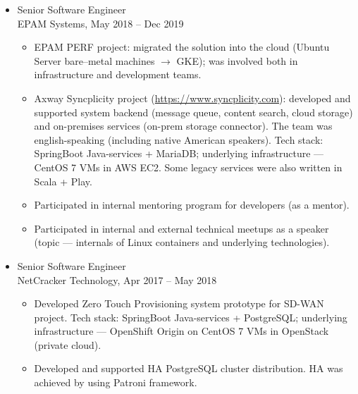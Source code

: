 \documentclass[letterpaper, 11pt]{article}
\begin{document}
    \begin{itemize}
        \item
            Senior Software Engineer \\
            \footnotesize
                EPAM Systems, May 2018 -- Dec 2019
            \normalsize
            
            \begin{itemize}
                \item
                    EPAM PERF project: migrated the solution into the cloud (Ubuntu Server bare--metal machines $\rightarrow$ GKE); was involved both in infrastructure and development teams.
                \item
                    Axway Syncplicity project (\url{https://www.syncplicity.com}): developed and supported system backend (message queue, content search, cloud storage) and on-premises services (on-prem storage connector). The team was english-speaking (including native American speakers). Tech stack: SpringBoot Java-services + MariaDB; underlying infrastructure --- CentOS 7 VMs in AWS EC2. Some legacy services were also written in Scala + Play.
                \item
                    Participated in internal mentoring program for developers (as a mentor).
                \item
                    Participated in internal and external technical meetups as a speaker (topic --- internals of Linux containers and underlying technologies).
            \end{itemize}

        \item
            Senior Software Engineer \\
            \footnotesize
                NetCracker Technology, Apr 2017 -- May 2018
            \normalsize
            
            \begin{itemize}
                \item
                    Developed Zero Touch Provisioning system prototype for SD-WAN project. Tech stack: SpringBoot Java-services + PostgreSQL; underlying infrastructure --- OpenShift Origin on CentOS 7 VMs in OpenStack (private cloud).
                \item
                    Developed and supported HA PostgreSQL cluster distribution. HA was achieved by using Patroni framework.
            \end{itemize}


\end{itemize}
\end{document}

